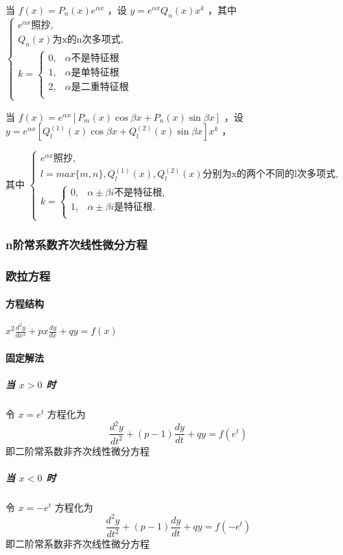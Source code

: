 ﻿\documentclass[a4paper,12pt,UTF8]{ctexart}
\begin{document}
    当 \(f(x)=P_n(x)e^{\alpha x}\) ，设 \(y=e^{\alpha x}Q_n(x)x^k\) ，其中
    \(\begin{cases}
        e^{\alpha x}\text{照抄},\\
        Q_n(x)\text{为x的n次多项式},\\
        k=
        \begin{cases}
            0, &\alpha\text{不是特征根}\\
            1, &\alpha\text{是单特征根}\\
            2, &\alpha\text{是二重特征根}\\
        \end{cases} 
    \end{cases}\)
    
    当 \(f(x)=e^{\alpha x}\left[P_m(x)\cos \beta x + P_n(x)\sin \beta x\right]\) ，设 \(y=e^{\alpha x} \left[Q_l^{(1)}(x)\cos \beta x + Q_l^{(2)}(x)\sin \beta x\right]x^k\) ，
    
    其中
    \(\begin{cases}
        e^{\alpha x}\text{照抄},\\
        l=max\{m,n\},Q_l^{(1)}(x),Q_l^{(2)}(x)\text{分别为x的两个不同的l次多项式},\\
        k=
        \begin{cases}
            0, &\alpha\pm\beta i \text{不是特征根},\\
            1, &\alpha\pm\beta i \text{是特征根}.\\
        \end{cases} 
    \end{cases}\)

    \subsubsection{n阶常系数齐次线性微分方程}

    \subsubsection{欧拉方程}
    \paragraph{方程结构} \(x^{2}\frac{d^2y}{dx^2}+px\frac{dy}{dx}+qy=f(x)\)
    \paragraph{固定解法}
    \subparagraph{当 \(x>0\) 时} 令 \(x=e^t\) 方程化为 \[\frac{d^2y}{dt^2}+(p-1)\frac{dy}{dt}+qy=f(e^t)\] 即二阶常系数非齐次线性微分方程
    \subparagraph{当 \(x<0\) 时} 令 \(x=-e^t\) 方程化为 \[\frac{d^2y}{dt^2}+(p-1)\frac{dy}{dt}+qy=f(-e^t)\] 即二阶常系数非齐次线性微分方程
\end{document}
